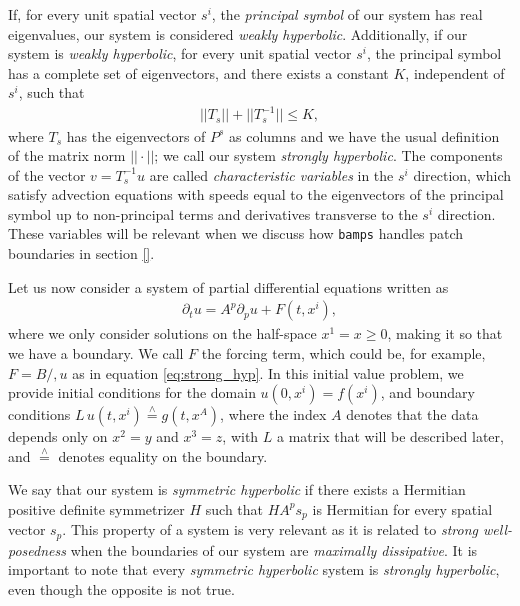 If, for every unit spatial vector $s^i$, the \textit{principal symbol} of our system has real eigenvalues, our system is considered \textit{weakly hyperbolic}. Additionally, if our system is \textit{weakly hyperbolic}, for every unit spatial vector $s^i$, the principal symbol has a complete set of eigenvectors, and there exists a constant $K$, independent of $s^i$, such that
%
\begin{align}
 ||T_s|| + ||T_s^{-1}|| \leq K,
\end{align}
%
where $T_s$ has the eigenvectors of $P^s$ as columns and we have the usual definition of the matrix norm $||\cdot||$; we call our system \textit{strongly hyperbolic}. The components of the vector $v = T^{-1}_s u$ are called \textit{characteristic variables} in the $s^i$ direction, which satisfy advection equations with speeds equal to the eigenvectors of the principal symbol up to non-principal terms and derivatives transverse to the $s^i$ direction. These variables will be relevant when we discuss how \texttt{bamps} handles patch boundaries in section \ref{}.


Let us now consider a system of partial differential equations written as
\begin{align}
    \partial_t u = A^p \partial_p u + F(t,x^i),
\end{align}
%
where we only consider solutions on the half-space $x^1 = x\geq 0$, making it so that we have a boundary. We call $F$ the forcing term, which could be, for example, $F = B /, u$ as in equation \eqref{eq:strong_hyp}. In this initial value problem, we provide initial conditions for the domain $u(0,x^i)=f(x^i)$, and boundary conditions $L\, u(t,x^i) \stackrel{\wedge}{=} g(t,x^A)$, where the index $A$ denotes that the data depends only on $x^2 = y$ and $x^3=z$, with $L$ a matrix that will be described later, and $\stackrel{\wedge}{=}$ denotes equality on the boundary.

We say that our system is \textit{symmetric hyperbolic} if there exists a Hermitian positive definite symmetrizer $H$ such that $H A^p s_p$ is Hermitian for every spatial vector $s_p$. This property of a system is very relevant as it is related to \textit{strong well-posedness} when the boundaries of our system are \textit{maximally dissipative}. It is important to note that every \textit{symmetric hyperbolic} system is \textit{strongly hyperbolic}, even though the opposite is not true.

